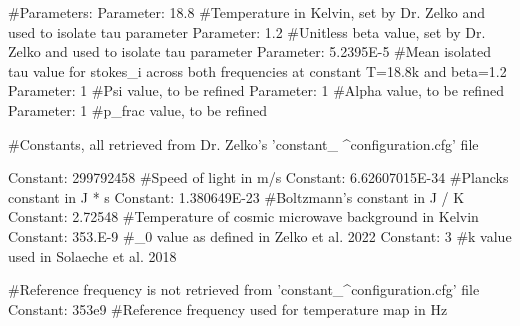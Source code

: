 #Parameters:
Parameter: 18.8 #Temperature in Kelvin, set by Dr. Zelko and used to isolate tau parameter
Parameter: 1.2 #Unitless beta value, set by Dr. Zelko and used to isolate tau parameter
Parameter: 5.2395E-5 #Mean isolated tau value for stokes_i across both frequencies at constant T=18.8k and beta=1.2
Parameter: 1 #Psi value, to be refined
Parameter: 1 #Alpha value, to be refined
Parameter: 1 #p_frac value, to be refined



#Constants, all retrieved from Dr. Zelko's 'constant_ ^configuration.cfg' file

Constant: 299792458 #Speed of light in m/s
Constant: 6.62607015E-34 #Plancks constant in J * s
Constant: 1.380649E-23 #Boltzmann's constant in J / K
Constant: 2.72548 #Temperature of cosmic microwave background in Kelvin
Constant: 353.E-9 #\nu_0 value as defined in Zelko et al. 2022
Constant: 3 #k value used in Solaeche et al. 2018

#Reference frequency is not retrieved from 'constant_^configuration.cfg' file
Constant: 353e9 #Reference frequency used for temperature map in Hz
